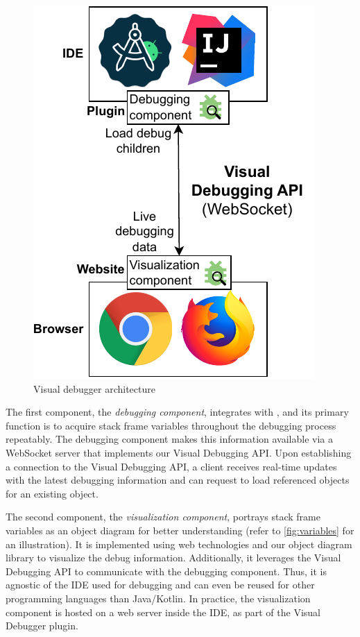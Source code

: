 \documentclass[sigconf]{acmart}
\begin{document}
\begin{figure}[ht]
  \centering
  \includegraphics[width=0.65\linewidth]{images/visual-debugger-architecture.pdf}
  \caption{Visual debugger architecture}
  \label{fig:architecture}
\end{figure}

The first component, the \textit{debugging component}, integrates with \intellij{}, and its primary function is to acquire stack frame variables throughout the debugging process repeatably.
The debugging component makes this information available via a WebSocket server that implements our Visual Debugging API.
Upon establishing a connection to the Visual Debugging API, a client receives real-time updates with the latest debugging information and can request to load referenced objects for an existing object.

The second component, the \textit{visualization component}, portrays stack frame variables as an object diagram for better understanding (refer to \autoref{fig:variables} for an illustration).
It is implemented using web technologies and our object diagram library \cite{timkrauterObjectdiagramjs2023} to visualize the debug information.
Additionally, it leverages the Visual Debugging API to communicate with the debugging component.
Thus, it is agnostic of the IDE used for debugging and can even be reused for other programming languages than Java/Kotlin.
In practice, the visualization component is hosted on a web server inside the IDE, as part of the Visual Debugger plugin.
\end{document}
